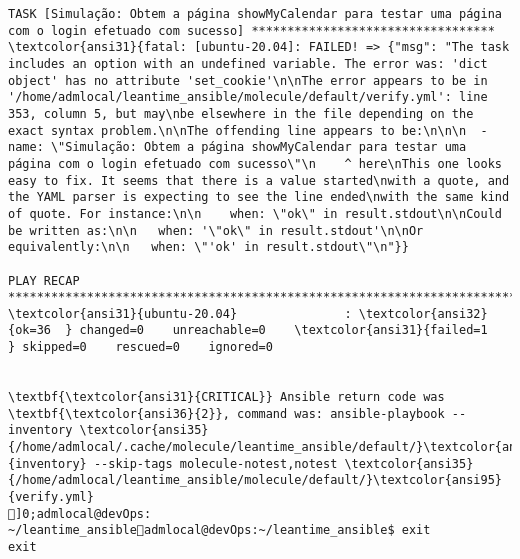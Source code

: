 \documentclass{scrartcl}
\begin{document}
\begin{Verbatim}
TASK [Simulação: Obtem a página showMyCalendar para testar uma página com o login efetuado com sucesso] **********************************
\textcolor{ansi31}{fatal: [ubuntu-20.04]: FAILED! => {"msg": "The task includes an option with an undefined variable. The error was: 'dict object' has no attribute 'set_cookie'\n\nThe error appears to be in '/home/admlocal/leantime_ansible/molecule/default/verify.yml': line 353, column 5, but may\nbe elsewhere in the file depending on the exact syntax problem.\n\nThe offending line appears to be:\n\n\n  - name: \"Simulação: Obtem a página showMyCalendar para testar uma página com o login efetuado com sucesso\"\n    ^ here\nThis one looks easy to fix. It seems that there is a value started\nwith a quote, and the YAML parser is expecting to see the line ended\nwith the same kind of quote. For instance:\n\n    when: \"ok\" in result.stdout\n\nCould be written as:\n\n   when: '\"ok\" in result.stdout'\n\nOr equivalently:\n\n   when: \"'ok' in result.stdout\"\n"}}

PLAY RECAP *******************************************************************************************************************************
\textcolor{ansi31}{ubuntu-20.04}               : \textcolor{ansi32}{ok=36  } changed=0    unreachable=0    \textcolor{ansi31}{failed=1   } skipped=0    rescued=0    ignored=0


\textbf{\textcolor{ansi31}{CRITICAL}} Ansible return code was \textbf{\textcolor{ansi36}{2}}, command was: ansible-playbook --inventory \textcolor{ansi35}{/home/admlocal/.cache/molecule/leantime_ansible/default/}\textcolor{ansi95}{inventory} --skip-tags molecule-notest,notest \textcolor{ansi35}{/home/admlocal/leantime_ansible/molecule/default/}\textcolor{ansi95}{verify.yml}
]0;admlocal@devOps: ~/leantime_ansibleadmlocal@devOps:~/leantime_ansible$ exit
exit

\end{Verbatim}
\end{document}
